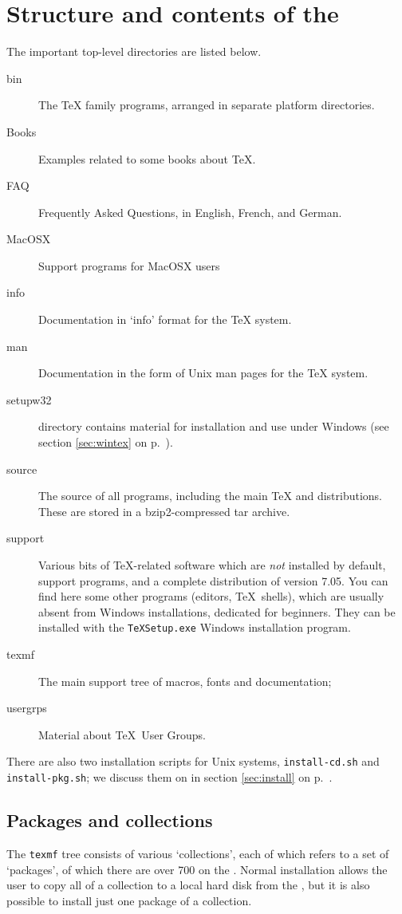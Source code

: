 \documentclass{article}
\begin{document}
\section[Structure and contents of the CD-ROM]{Structure 
  and contents of the \protect\CD{}}
The important \CD{} top-level directories are listed below.
\begin{description}
\item[bin] The \TeX{} family programs, arranged in separate platform
  directories.
\item[Books] Examples related to some books about \TeX.
\item[FAQ] Frequently Asked Questions, in English, French, and German.
\item[MacOSX] Support programs for MacOSX users
\item[info] Documentation in  `info' format for the \TeX{}
  system.
\item[man] Documentation in the form of Unix man pages for the \TeX{}
  system.
\item[setupw32] directory contains material for installation and use
  under Windows (see section \ref{sec:wintex} on p.~\pageref{sec:wintex}).
\item[source] The source of all programs, including the main \Webc{}
  \TeX{} and \MF{} distributions. These are stored in a bzip2-compressed
  tar archive.
\item[support] Various bits of \TeX-related software which are
  \emph{not} installed by default, support programs, and a complete 
  distribution of  version 7.05.
  You can find here some other programs (editors, \TeX\ shells), which 
  are usually absent from Windows installations, dedicated for beginners.
  They can be installed with the \texttt{TeXSetup.exe} Windows installation
  program.
\item[texmf] The main support tree of macros, fonts and documentation;
\item[usergrps] Material about \TeX\ User Groups.
\end{description}

There are also two installation scripts for Unix systems, 
\texttt{install-cd.sh} and \texttt{install-pkg.sh}; we discuss
them on in section \ref{sec:install} on p.~\pageref{sec:install}.

\subsection[Packages and collections]{Packages and collections}
\label{packages}
The \TeXLive{} \texttt{texmf} tree consists of various `collections',
each of which refers to a set of `packages', of which there are over 700 
on the \CD{}. Normal installation allows the
user to copy all of a collection to a local hard disk from the \CD{}, but
it is also possible to install just one package of a collection.
\end{document}
